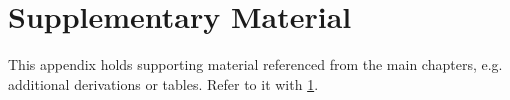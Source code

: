 \chapter{Supplementary Material}
\label{app:supplementary}

This appendix holds supporting material referenced from the main chapters, e.g.
additional derivations or tables. Refer to it with \cref{app:supplementary}.
